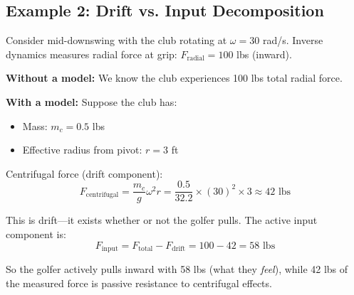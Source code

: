 \documentclass[11pt,a4paper]{article}
\theoremstyle{definition}
\theoremstyle{plain}
\begin{document}
\subsection{Example 2: Drift vs. Input Decomposition}

Consider mid-downswing with the club rotating at $\omega = 30$ rad/s. Inverse dynamics measures radial force at grip: $F_{\text{radial}} = 100$ lbs (inward).

\textbf{Without a model:} We know the club experiences 100 lbs total radial force.

\textbf{With a model:} Suppose the club has:
\begin{itemize}
    \item Mass: $m_c = 0.5$ lbs
    \item Effective radius from pivot: $r = 3$ ft
\end{itemize}

Centrifugal force (drift component):
\begin{equation}
F_{\text{centrifugal}} = \frac{m_c}{g} \omega^2 r = \frac{0.5}{32.2} \times (30)^2 \times 3 \approx 42 \text{ lbs}
\end{equation}

This is drift—it exists whether or not the golfer pulls. The active input component is:
\begin{equation}
F_{\text{input}} = F_{\text{total}} - F_{\text{drift}} = 100 - 42 = 58 \text{ lbs}
\end{equation}

So the golfer actively pulls inward with 58 lbs (what they \emph{feel}), while 42 lbs of the measured force is passive resistance to centrifugal effects.
\end{document}
